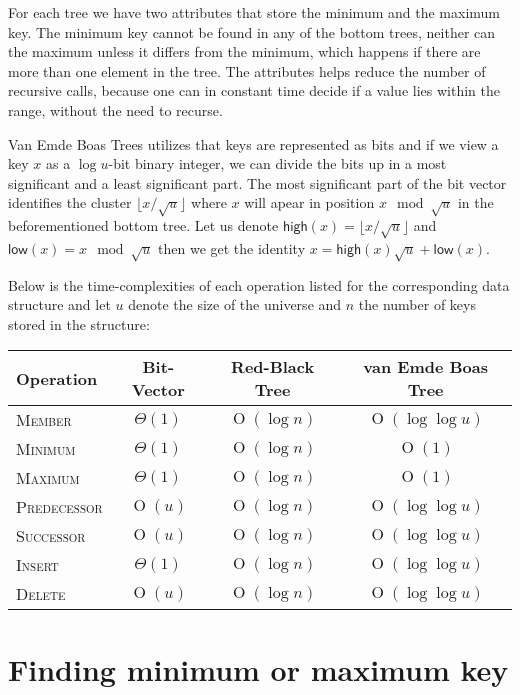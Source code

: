 \documentclass[oneside,11pt,openright]{report}
\newcommand{\BigO}[1]{\ensuremath{\operatorname{O}\left(#1\right)}}
\newcommand{\BigT}[1]{\ensuremath{\Theta\left(#1\right)}}
\newcommand{\Insert}{\textsc{Insert}}
\newcommand{\Delete}{\textsc{Delete}}
\newcommand{\Member}{\textsc{Member}}
\newcommand{\Minimum}{\textsc{Minimum}}
\newcommand{\Maximum}{\textsc{Maximum}}
\newcommand{\Predecessor}{\textsc{Predecessor}}
\newcommand{\Successor}{\textsc{Successor}}
\newcommand{\HIGH}{\textsf{high}}
\newcommand{\LOW}{\textsf{low}}
\begin{document}
For each tree we have two attributes that store the minimum and the
maximum key. The minimum key cannot be found in any of the bottom
trees, neither can the maximum unless it differs from the minimum,
which happens if there are more than one element in the tree. The
attributes helps reduce the number of recursive calls, because one can
in constant time decide if a value lies within the range, without the
need to recurse.

Van Emde Boas Trees utilizes that keys are represented as bits and if
we view a key $x$ as a $\log u$-bit binary integer, we can divide the
bits up in a most significant and a least significant part. The most
significant part of the bit vector identifies the cluster
$\lfloor{x/\sqrt{u}}\rfloor$ where $x$ will apear in position $x \mod
\sqrt{u}$ in the beforementioned bottom tree. Let us denote $\HIGH(x)
= \lfloor{x/\sqrt{u}}\rfloor$ and $\LOW(x) = x \mod \sqrt{u}$ then we
get the identity $x = \HIGH(x) \sqrt{u} + \LOW(x)$.

Below is the time-complexities of each operation listed for the
corresponding data structure and let $u$ denote the size of the
universe and $n$ the number of keys stored in the structure:

\begin{center}
  \begin{tabular}{ l | c | c | c }
    Operation & Bit-Vector & Red-Black Tree & van Emde Boas Tree \\ \hline
    \Member & $\BigT{1}$ & $\BigO{\log n}$ & $\BigO{\log \log u}$ \\ 
    \Minimum & $\BigT{1}$ & $\BigO{\log n}$ & $\BigO{1}$\\ 
    \Maximum & $\BigT{1}$ & $\BigO{\log n}$ & $\BigO{1}$ \\ 
    \Predecessor & $\BigO{u}$ & $\BigO{\log n}$ & $\BigO{\log \log u}$  \\ 
    \Successor & $\BigO{u}$ & $\BigO{\log n}$ & $\BigO{\log \log u}$ \\ 
    \Insert & $\BigT{1}$ & $\BigO{\log n}$ & $\BigO{\log \log u}$ \\ 
    \Delete & $\BigO{u}$ & $\BigO{\log n}$ & $\BigO{\log \log u}$ \\
  \end{tabular}
\end{center}

\section{Finding minimum or maximum key}
\end{document}
